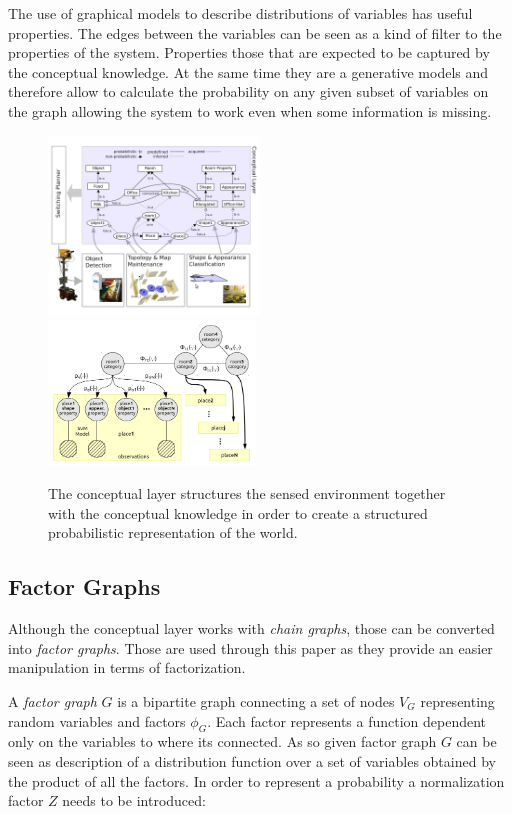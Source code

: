 \documentclass[runningheads,a4paper]{llncs}
\begin{document}
The use of graphical models to describe distributions of variables has useful properties.
The edges between the variables can be seen as a kind of filter to the properties of the system.
Properties those that are expected to be captured by the conceptual knowledge.
At the same time they are a generative models and therefore allow to calculate the probability
on any given subset of variables on the graph allowing the system to work even when some
information is missing.


\begin{figure}[h]
\centering

\includegraphics[width=0.50\textwidth]{figures/conceptual-layer.jpg}
\includegraphics[width=0.49\textwidth]{figures/chain-graph.png}
\caption{The conceptual layer structures the sensed environment together with the conceptual knowledge
         in order to create a structured probabilistic representation of the world.}
\end{figure}

\subsection{Factor Graphs}
Although the conceptual layer works with \emph{chain graphs}, those can be converted into \emph{factor graphs}.
Those are used through this paper as they provide an easier manipulation in terms of factorization.

A \emph{factor graph} $G$ is a bipartite graph connecting a set of nodes $V_G$ representing
random variables and factors $\phi_G$.
Each factor represents a function dependent only on the variables to where its connected.
As so given factor graph $G$ can be seen as description of a distribution function over a set
of variables obtained by the product of all the factors. In order to represent a probability
a normalization factor $Z$ needs to be introduced:
\end{document}
